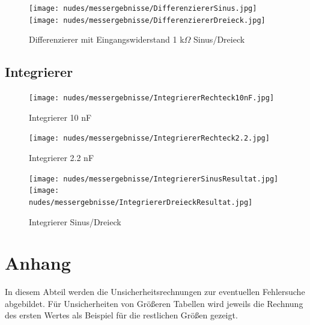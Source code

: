 \documentclass[12pt,a4paper,twoside]{article}
\begin{document}
\begin{figure}[H]
    \centering
    \texttt{[image: nudes/messergebnisse/DifferenziererSinus.jpg]}
    \texttt{[image: nudes/messergebnisse/DifferenziererDreieck.jpg]}
    \caption{Differenzierer mit Eingangswiderstand 1 k$\Omega$ Sinus/Dreieck}
    \label{fig:Differenzierer1R1Sinus/DreieckAW}
\end{figure}

\subsection{Integrierer}

\begin{figure}[H]
    \centering
    \texttt{[image: nudes/messergebnisse/IntegriererRechteck10nF.jpg]}
    \caption{Integrierer 10 nF}
    \label{fig:IntegriererResultat1AW}
\end{figure}

\begin{figure}[H]
    \centering
    \texttt{[image: nudes/messergebnisse/IntegriererRechteck2.2.jpg]}
    \caption{Integrierer 2.2 nF}
    \label{fig:IntegriererResultat2AW}
\end{figure}

\begin{figure}[H]
    \centering
    \texttt{[image: nudes/messergebnisse/IntegriererSinusResultat.jpg]}
    \texttt{[image: nudes/messergebnisse/IntegriererDreieckResultat.jpg]}
    \caption{Integrierer Sinus/Dreieck}
    \label{fig:IntegriererResultat3AW}
\end{figure}


\section{Anhang}

In diesem Abteil werden die Unsicherheitsrechnungen zur eventuellen Fehlersuche abgebildet. Für Unsicherheiten von Größeren Tabellen wird jeweils die Rechnung des ersten Wertes als Beispiel für die restlichen Größen gezeigt.


\printbibliography[heading=bibintoc]
\end{document}
